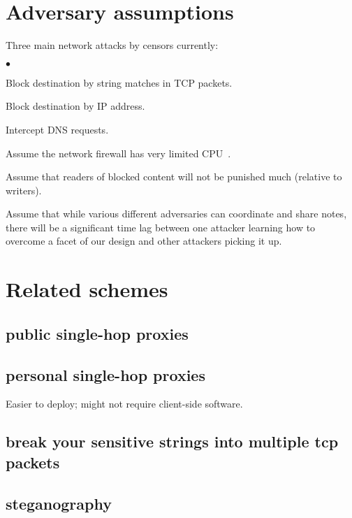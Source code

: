 \documentclass{llncs}
\newenvironment{tightlist}{\begin{list}{$\bullet$}{
  \setlength{\itemsep}{0mm}
    \setlength{\parsep}{0mm}
    }}{\end{list}}
\begin{document}
\section{Adversary assumptions}
\label{sec:adversary}

Three main network attacks by censors currently:

\begin{tightlist}
\item Block destination by string matches in TCP packets.

\item Block destination by IP address.

\item Intercept DNS requests.
\end{tightlist}

Assume the network firewall has very limited CPU~\cite{clayton06}.

Assume that readers of blocked content will not be punished much
(relative to writers).

Assume that while various different adversaries can coordinate and share
notes, there will be a significant time lag between one attacker learning
how to overcome a facet of our design and other attackers picking it up.




\section{Related schemes}

\subsection{public single-hop proxies}

\subsection{personal single-hop proxies}

Easier to deploy; might not require client-side software.

\subsection{break your sensitive strings into multiple tcp packets}

\subsection{steganography}
\end{document}
